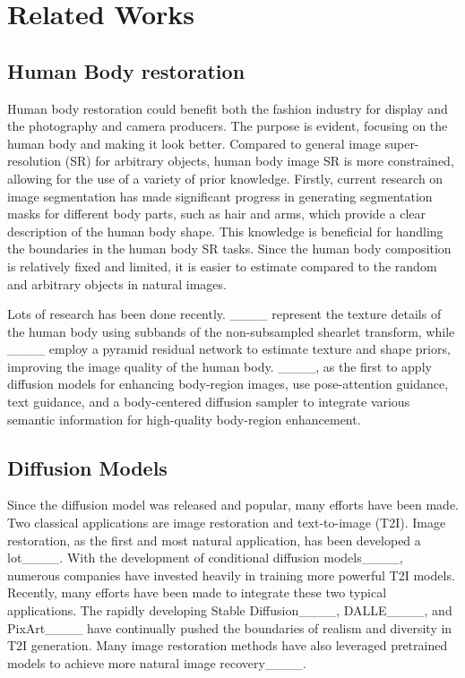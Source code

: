 \section{Related Works}
\vspace{-1mm}
\subsection{Human Body restoration}
\vspace{-1mm}
Human body restoration could benefit both the fashion industry for display and the photography and camera producers. The purpose is evident, focusing on the human body and making it look better. Compared to general image super-resolution (SR) for arbitrary objects, human body image SR is more constrained, allowing for the use of a variety of prior knowledge. Firstly, current research on image segmentation has made significant progress in generating segmentation masks for different body parts, such as hair and arms, which provide a clear description of the human body shape. This knowledge is beneficial for handling the boundaries in the human body SR tasks. Since the human body composition is relatively fixed and limited, it is easier to estimate compared to the random and arbitrary objects in natural images. 

Lots of research has been done recently. ____ represent the texture details of the human body using subbands of the non-subsampled shearlet transform, while ____ employ a pyramid residual network to estimate texture and shape priors, improving the image quality of the human body. ____, as the first to apply diffusion models for enhancing body-region images, use pose-attention guidance, text guidance, and a body-centered diffusion sampler to integrate various semantic information for high-quality body-region enhancement.

\vspace{-1mm}
\subsection{Diffusion Models}
\vspace{-1mm}
Since the diffusion model was released and popular, many efforts have been made. Two classical applications are image restoration and text-to-image (T2I). Image restoration, as the first and most natural application, has been developed a lot____. With the development of conditional diffusion models____, numerous companies have invested heavily in training more powerful T2I models. Recently, many efforts have been made to integrate these two typical applications. The rapidly developing Stable Diffusion____, DALLE____, and PixArt____ have continually pushed the boundaries of realism and diversity in T2I generation. Many image restoration methods have also leveraged pretrained models to achieve more natural image recovery____.

